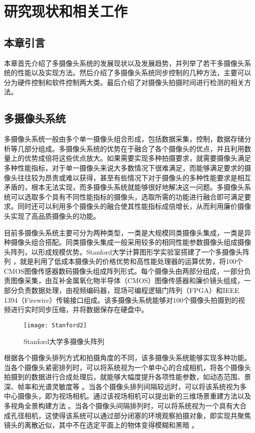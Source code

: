 \chapter{研究现状和相关工作}

\section{本章引言}

本章首先介绍了多摄像头系统的发展现状以及发展趋势，并列举了若干多摄像头系统的性能以及实现方法。然后介绍了多摄像头系统同步控制的几种方法，主要可以分为硬件控制和软件控制两大类。最后介绍了对摄像头拍摄时间进行检测的相关方法。

\section{多摄像头系统}

多摄像头系统一般由多个单一摄像头组合形成，包括数据采集，控制，数据存储分析等几部分组成。多摄像头系统的优势在于融合了各个摄像头的优点，并且利用数量上的优势成倍将这些优点放大。如果需要实现多种拍摄要求，就需要摄像头满足多种性能指标，对于单一摄像头来说大多数情况下很难满足，而能够满足要求的摄像头往往较为昂贵或难以获得，甚至有些情况下对于摄像头的多种性能要求是相互矛盾的，根本无法实现，而多摄像头系统就能够很好地解决这一问题。多摄像头系统可以选取多个具有不同性能指标的摄像头，选取所需的功能进行融合即可满足要求。同时还可以利用多个摄像头的融合使其性能指标成倍增长，从而利用廉价摄像头实现了高品质摄像头的功能。

目前多摄像头系统主要可分为两种类型，一类是大规模同类摄像头集成，一类是异种摄像头组合搭配。同类摄像头集成一般采用较多的相同性能参数摄像头组成摄像头阵列，以形成规模优势。Stanford大学计算图形学实验室搭建了一个多摄像头阵列 \cite{3}，就是利用了低成本摄像头的价格优势和高性能处理器的运算优势，将100个CMOS图像传感器数码摄像头组成阵列形式。每个摄像头由两部分组成，一部分负责图像采集，由互补金属氧化物半导体（CMOS）图像传感器和廉价镜头组成，一部分负责数据处理，由视频编码器，现场可编程逻辑门阵列（FPGA）和IEEE 1394（Firewire）传输接口组成。该多摄像头系统能够对100个摄像头拍摄到的视频进行实时同步压缩，并将数据保存在硬盘中。

\begin{figure}[h] 
  \centering
  \texttt{[image: Stanford2]}
  \caption{Stanford大学多摄像头阵列}
  \label{Stanford2}
\end{figure}

根据各个摄像头排列方式和拍摄角度的不同，该多摄像头系统能够实现多种功能。当各个摄像头紧密排列时，可以将系统视为一个单中心的合成相机，将各个摄像头拍摄到的数据进行合成处理后，就能够大幅度提升各项性能参数，如动态范围、景深、帧率和光谱灵敏度等 \cite{4, 7}。当各个摄像头排列间隔较远时，可以将该系统视为多中心摄像头，即为视场相机。通过该视场相机可以提出新的三维场景重建方法以及多视角全景构建方法 \cite{5}。当各个摄像头间隔排列时，可以将系统视为一个具有大合成孔径相机，这使得该系统可以通过部分闭塞的环境观察拍摄对象，即实现共聚焦镜头的离散近似，其中不在选定平面上的物体变得模糊和黑暗 \cite{6, 8}。

